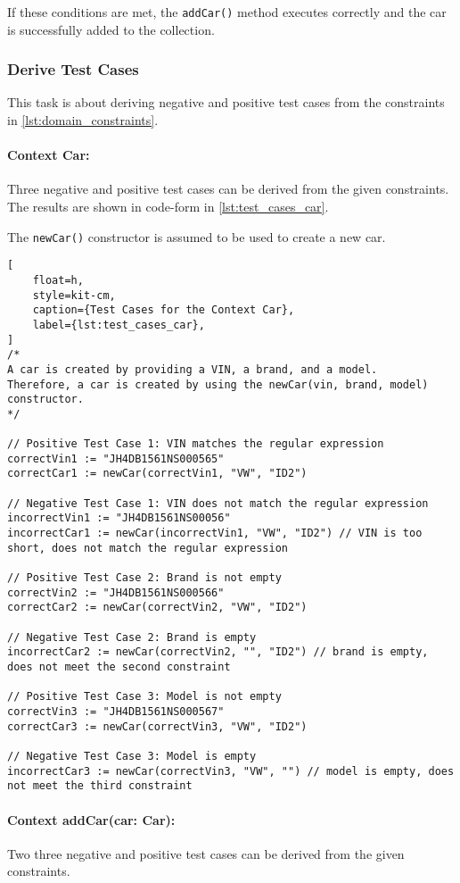 If these conditions are met, the \texttt{addCar()} method executes correctly and the car is successfully added to the collection.

\subsubsection*{Derive Test Cases}
This task is about deriving negative and positive test cases from the constraints in \autoref*{lst:domain_constraints}.

\paragraph*{Context Car:}
Three negative and positive test cases can be derived from the given constraints.
The results are shown in code-form in \autoref*{lst:test_cases_car}.

The \texttt{newCar()} constructor is assumed to be used to create a new car.

\begin{lstlisting}[
    float=h,
    style=kit-cm,
    caption={Test Cases for the Context Car},
    label={lst:test_cases_car}, 
]
/*
A car is created by providing a VIN, a brand, and a model.
Therefore, a car is created by using the newCar(vin, brand, model) constructor.
*/

// Positive Test Case 1: VIN matches the regular expression
correctVin1 := "JH4DB1561NS000565"
correctCar1 := newCar(correctVin1, "VW", "ID2")

// Negative Test Case 1: VIN does not match the regular expression
incorrectVin1 := "JH4DB1561NS00056"
incorrectCar1 := newCar(incorrectVin1, "VW", "ID2") // VIN is too short, does not match the regular expression

// Positive Test Case 2: Brand is not empty
correctVin2 := "JH4DB1561NS000566"
correctCar2 := newCar(correctVin2, "VW", "ID2")

// Negative Test Case 2: Brand is empty
incorrectCar2 := newCar(correctVin2, "", "ID2") // brand is empty, does not meet the second constraint

// Positive Test Case 3: Model is not empty
correctVin3 := "JH4DB1561NS000567"
correctCar3 := newCar(correctVin3, "VW", "ID2")

// Negative Test Case 3: Model is empty
incorrectCar3 := newCar(correctVin3, "VW", "") // model is empty, does not meet the third constraint
\end{lstlisting}

\paragraph*{Context addCar(car: Car):}
Two three negative and positive test cases can be derived from the given constraints.


